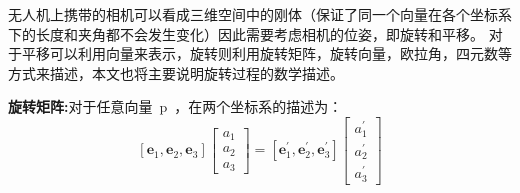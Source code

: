 
无人机上携带的相机可以看成三维空间中的刚体（保证了同一个向量在各个坐标系下的长度和夹角都不会发生变化）因此需要考虑相机的位姿，即旋转和平移。
对于平移可以利用向量来表示，旋转则利用旋转矩阵，旋转向量，欧拉角，四元数等方式来描述，本文也将主要说明旋转过程的数学描述。

\textbf{旋转矩阵:}对于任意向量{~p~}，在两个坐标系的描述为：
\begin{equation}
  \left[\mathbf{e}_{1}, \mathbf{e}_{2}, \mathbf{e}_{3}\right]\left[\begin{array}{l}{a_{1}} \\ {a_{2}} \\ {a_{3}}\end{array}\right]=\left[\mathbf{e}_{1}^{\prime}, \mathbf{e}_{2}^{\prime}, \mathbf{e}_{3}^{\prime}\right]\left[\begin{array}{c}{a_{1}^{\prime}} \\ {a_{2}^{\prime}} \\ {a_{3}^{\prime}}\end{array}\right]
\end{equation}

